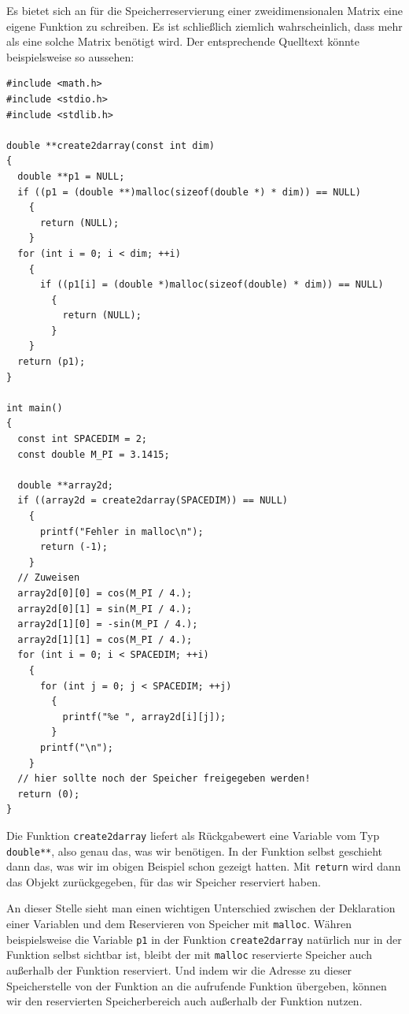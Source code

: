 Es bietet sich an für die Speicherreservierung einer zweidimensionalen Matrix eine eigene Funktion zu schreiben.
Es ist schließlich ziemlich wahrscheinlich, dass mehr als eine solche Matrix benötigt wird.
Der entsprechende Quelltext könnte beispielsweise so aussehen:
\begin{lstlisting}
#include <math.h>
#include <stdio.h>
#include <stdlib.h>

double **create2darray(const int dim)
{
  double **p1 = NULL;
  if ((p1 = (double **)malloc(sizeof(double *) * dim)) == NULL)
    {
      return (NULL);
    }
  for (int i = 0; i < dim; ++i)
    {
      if ((p1[i] = (double *)malloc(sizeof(double) * dim)) == NULL)
        {
          return (NULL);
        }
    }
  return (p1);
}

int main()
{
  const int SPACEDIM = 2;
  const double M_PI = 3.1415;

  double **array2d;
  if ((array2d = create2darray(SPACEDIM)) == NULL)
    {
      printf("Fehler in malloc\n");
      return (-1);
    }
  // Zuweisen
  array2d[0][0] = cos(M_PI / 4.);
  array2d[0][1] = sin(M_PI / 4.);
  array2d[1][0] = -sin(M_PI / 4.);
  array2d[1][1] = cos(M_PI / 4.);
  for (int i = 0; i < SPACEDIM; ++i)
    {
      for (int j = 0; j < SPACEDIM; ++j)
        {
          printf("%e ", array2d[i][j]);
        }
      printf("\n");
    }
  // hier sollte noch der Speicher freigegeben werden!
  return (0);
}
\end{lstlisting}
Die Funktion \verb|create2darray| liefert als Rückgabewert eine Variable vom Typ \verb|double**|, also genau das, was wir benötigen.
In der Funktion selbst geschieht dann das, was wir im obigen Beispiel schon gezeigt hatten.
Mit \verb|return| wird dann das Objekt zurückgegeben, für das wir Speicher reserviert haben.

An dieser Stelle sieht man einen wichtigen Unterschied zwischen der Deklaration einer Variablen und dem Reservieren von Speicher mit \verb|malloc|.
Währen beispielsweise die Variable \verb|p1| in der Funktion \verb|create2darray| natürlich nur in der Funktion selbst sichtbar ist, bleibt der mit \verb|malloc| reservierte Speicher auch außerhalb der Funktion reserviert.
Und indem wir die Adresse zu dieser Speicherstelle von der Funktion an die aufrufende Funktion übergeben, können wir den reservierten Speicherbereich auch außerhalb der Funktion nutzen.

